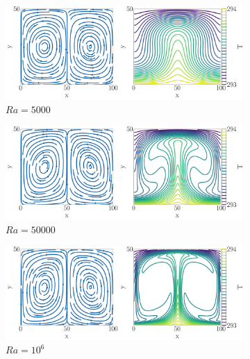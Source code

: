 \begin{figure}[htp]

\centering

\begin{subfigure}{.8\textwidth}
    \centering
    \includegraphics[width=.95\textwidth]{figures/Ra5000.pdf}
    \caption{$\textit{Ra} = 5000$}\label{fig:Ra5000}
\end{subfigure}


\bigskip

\begin{subfigure}{.8\textwidth}
    \centering
    \includegraphics[width=.95\textwidth]{figures/Ra50000.pdf}
    \caption{$\textit{Ra} = 50000$}\label{fig:Ra50000}
\end{subfigure}

\bigskip

\begin{subfigure}{.8\textwidth}
    \centering
    \includegraphics[width=.95\textwidth]{figures/Ra1000000.pdf}
    \caption{$\textit{Ra} = 10^6$}\label{fig:Ra1000000}
\end{subfigure}

\caption{}\label{fig:Rayleigh-Benard}
\end{figure}

